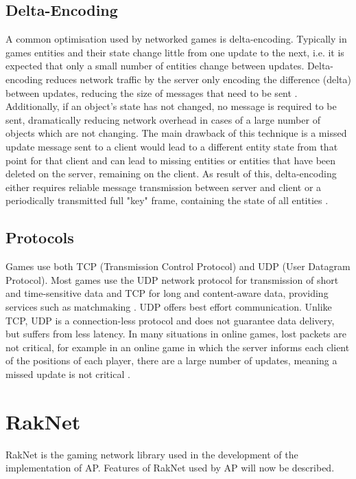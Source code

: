\subsection{Delta-Encoding}
A common optimisation used by networked games is delta-encoding. Typically in games entities and their state change little from one update to the next, i.e. it is expected that only a small number of entities change between updates. Delta-encoding reduces network traffic by the server only encoding the difference (delta) between updates, reducing the size of messages that need to be sent \cite{bharambe2006colyseus}. Additionally, if an object's state has not changed, no message is required to be sent, dramatically reducing network overhead in cases of a large number of objects which are not changing. The main drawback of this technique is a missed update message sent to a client would lead to a different entity state from that point for that client and can lead to missing entities or entities that have been deleted on the server, remaining on the client. As result of this, delta-encoding either requires reliable message transmission between server and client or a periodically transmitted full "key" frame, containing the state of all entities \cite{bharambe2004supporting}.

\subsection{Protocols}
Games use both TCP (Transmission Control Protocol) and UDP (User Datagram Protocol). Most games use the UDP network protocol for transmission of short and time-sensitive data and TCP for long and content-aware data, providing services such as matchmaking \cite{2018NetworkTraffic, 2012PacketLevelTraffic}. UDP offers best effort communication. Unlike TCP, UDP is a connection-less protocol and does not guarantee data delivery, but suffers from less latency. In many situations in online games, lost packets are not critical, for example in an online game in which  the server informs each client of the positions of each player, there are a large number of updates, meaning a missed update is not critical \cite{pisan2004challenges}. 

\section{RakNet}
RakNet is the gaming network library used in the development of the implementation of AP. Features of RakNet used by AP will now be described.

